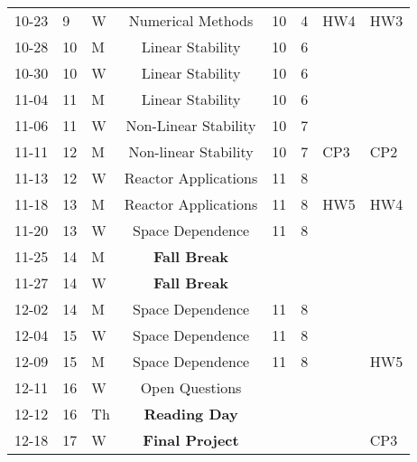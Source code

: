 \documentclass[11pt]{article}
\begin{document}
\begin{table}[h]
\begin{center}
\begin{tabular}{lllcllll}
10-23 & 9 & W & Numerical Methods               & 10 & 4 & HW4  & HW3\\
10-28 & 10 & M  & Linear Stability              & 10 & 6 &      & \\
10-30 & 10 & W & Linear Stability               & 10 & 6 &      & \\
11-04 & 11 & M  & Linear Stability              & 10 & 6 &      & \\
11-06 & 11 & W & Non-Linear Stability           & 10 & 7 &      & \\
11-11 & 12 & M  & Non-linear Stability          & 10 & 7 & CP3  & CP2\\
11-13 & 12 & W & Reactor Applications           & 11 & 8 &      & \\
11-18 & 13 & M  & Reactor Applications          & 11 & 8 & HW5  & HW4 \\
11-20 & 13 & W & Space Dependence               & 11 & 8 &      & \\
11-25 & 14 & M  & \textbf{Fall Break}           &    &   &      & \\
11-27 & 14 & W & \textbf{Fall Break}            &    &   &      & \\
12-02 & 14 & M & Space Dependence               & 11 & 8 &      & \\
12-04 & 15 & W  & Space Dependence              & 11 & 8 &      & \\
12-09 & 15 & M & Space Dependence               & 11 & 8 &      & HW5\\
12-11 & 16 & W  & Open Questions                &    &   &      & \\
12-12 & 16 & Th & \textbf{Reading Day}          &    &   &      & \\
12-18 & 17 & W & \textbf{Final Project}         &    &   &      & CP3 \\
\end{tabular}
\end{center}
\end{table}
\end{document}
